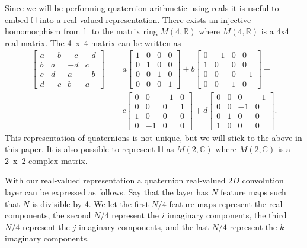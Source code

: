 \documentclass[14pt,a4paper]{article}
\begin{document}
Since we will be performing quaternion arithmetic using reals it is useful to embed $\mathbb{H}$ into a real-valued representation.
There exists an injective homomorphism from $\mathbb{H}$ to the matrix ring $M(4,\mathbb{R})$ where $M(4,\mathbb{R})$ is a 4x4 real matrix.
The 4~x~4 matrix can be written as
\begin{align}
\begin{bmatrix}
 a & -b & -c & -d \\ 
 b & a & -d & c \\
 c & d & a & -b \\
 d & -c & b & a 
\end{bmatrix}= &a
\begin{bmatrix}
 1 & 0 & 0 & 0 \\ 
 0 & 1 & 0 & 0 \\
 0 & 0 & 1 & 0 \\
 0 & 0 & 0 & 1 
\end{bmatrix}
+ b
\begin{bmatrix}
 0 & -1 & 0 & 0 \\ 
 1 & 0 & 0 & 0 \\
 0 & 0 & 0 & -1 \\
 0 & 0 & 1 & 0 
\end{bmatrix}
+ \nonumber \\
&c
\begin{bmatrix}
 0 & 0 & -1 & 0 \\ 
 0 & 0 & 0 & 1 \\
 1 & 0 & 0 & 0 \\
 0 & -1 & 0 & 0 
\end{bmatrix}
+ d
\begin{bmatrix}
 0 & 0 & 0 & -1 \\ 
 0 & 0 & -1 & 0 \\
 0 & 1 & 0 & 0 \\
 1 & 0 & 0 & 0 
\end{bmatrix}.
\label{eq:m4r}
\end{align}
This representation of quaternions is not unique, but we will stick to the above in this paper.
It is also possible to represent $\mathbb{H}$ as $M(2,\mathbb{C})$ where $M(2,\mathbb{C})$ is a 2~x~2 complex matrix.

With our real-valued representation a quaternion real-valued $2D$ convolution layer can be expressed as follows. 
Say that the layer has $N$ feature maps such that $N$ is divisible by 4.
We let the first $N/4$ feature maps represent the real components, the second $N/4$ represent the $i$ imaginary components, the third $N/4$ represent the $j$ imaginary components, and the last $N/4$ represent the $k$ imaginary components.
\end{document}
